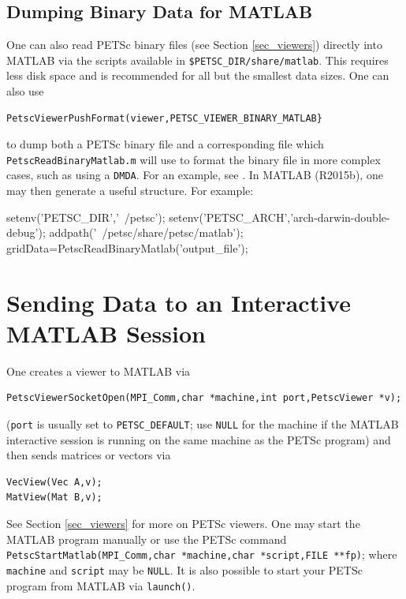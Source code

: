 \subsection{Dumping Binary Data for MATLAB}
One can also read PETSc binary files (see Section \ref{sec_viewers}) directly into MATLAB via the scripts available in \lstinline{$PETSC_DIR/share/matlab}.
This requires less disk space and is recommended for all but the smallest data sizes.
One can also use
\begin{lstlisting}
PetscViewerPushFormat(viewer,PETSC_VIEWER_BINARY_MATLAB} 
\end{lstlisting}
to dump both a PETSc binary file and a corresponding  file which 
\lstinline{PetscReadBinaryMatlab.m} will use to format the binary file in more complex cases, such as using a \lstinline{DMDA}. 
For an example, see \href{http://www.mcs.anl.gov/petsc/petsc-current/src/dm/examples/tutorials/ex7.c.html}{}.
In MATLAB (R2015b), one may then generate a useful structure. For example:
\begin{outputlisting}[\normalsize\ttfamily]
setenv('PETSC_DIR','~/petsc');
setenv('PETSC_ARCH','arch-darwin-double-debug');
addpath('~/petsc/share/petsc/matlab');
gridData=PetscReadBinaryMatlab('output_file');
\end{outputlisting}

\section{Sending Data to an Interactive MATLAB Session}
\label{sec_matlabsocket}

One creates a viewer to MATLAB via
\begin{lstlisting}
PetscViewerSocketOpen(MPI_Comm,char *machine,int port,PetscViewer *v);
\end{lstlisting}
(\lstinline{port} is usually set to \lstinline{PETSC_DEFAULT}; use \lstinline{NULL} for the machine if the
MATLAB interactive session is running on the same machine as the PETSc program)
and then sends matrices or vectors via
\begin{lstlisting}
VecView(Vec A,v);
MatView(Mat B,v);
\end{lstlisting}
See Section \ref{sec_viewers} for more on PETSc viewers.
One may start the MATLAB program manually or use the PETSc command
\lstinline{PetscStartMatlab(MPI_Comm,char *machine,char *script,FILE **fp)}; where \lstinline{machine} and \lstinline{script} may be \lstinline{NULL}.
It is also possible to start your PETSc program from MATLAB via \lstinline{launch()}.

